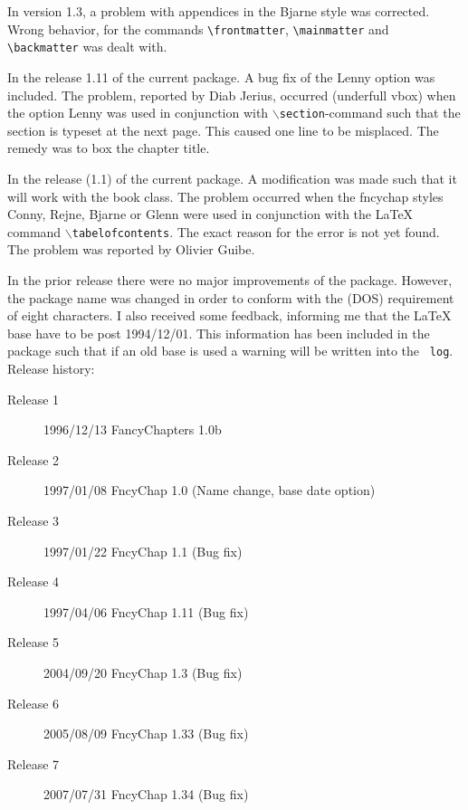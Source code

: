 \documentclass{report}
\newcommand{\A}[1]{{$\backslash${\tt #1}}}
\begin{document}
      In version 1.3, a problem with appendices in the Bjarne style was
      corrected. Wrong behavior, for the commands
      \verb+\frontmatter+, \verb+\mainmatter+ and  \verb+\backmatter+
      was dealt with. 

      In the release 1.11 of the current package. A bug
      fix of the Lenny option was included. The problem, reported
      by Diab Jerius, occurred (underfull vbox) when the option Lenny
      was used in conjunction with \A{section}-command such that the
      section is typeset at the next page. This caused one line to be
      misplaced. The remedy was to box the chapter title.

      In the release (1.1) of the current package. A
      modification was made such that it will work with the book
      class. The problem occurred when the fncychap styles Conny,
      Rejne, Bjarne or Glenn were used in conjunction with the
      \LaTeX{} command \A{tabelofcontents}. The exact reason for the
      error is not yet found. The problem was reported by Olivier Guibe.

      In the prior release there were no major improvements of the
      package. However, the package name was changed in order to
      conform with the (DOS) requirement of eight characters. I also
      received some feedback, informing me that the \LaTeX{} base have
      to be post 1994/12/01.  This information has been included in
      the package such that if an old base is used a warning will be
      written into the {\tt
        log}.\\
      Release history:
      \begin{description}
        \item[Release 1] 1996/12/13 FancyChapters 1.0b
        \item[Release 2] 1997/01/08 FncyChap 1.0 (Name change, base
          date option)
        \item[Release 3] 1997/01/22 FncyChap 1.1 (Bug fix)
        \item[Release 4] 1997/04/06 FncyChap 1.11 (Bug fix)
        \item[Release 5] 2004/09/20 FncyChap 1.3 (Bug fix)
        \item[Release 6] 2005/08/09 FncyChap 1.33 (Bug fix)
        \item[Release 7] 2007/07/31 FncyChap 1.34 (Bug fix)
      \end{description}
\end{document}
